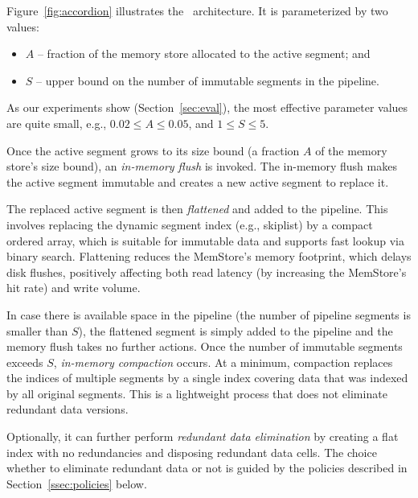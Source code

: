 Figure~\ref{fig:accordion} illustrates the \sys\ architecture. It is parameterized by two values:
\begin{itemize}
\item  $A$ --  fraction of the memory store allocated to the active segment; and 
\item $S$ --  upper bound on the number of immutable segments in the pipeline. 
\end{itemize}

\noindent
As our experiments show (Section~\ref{sec:eval}), the most effective parameter values are quite small, 
e.g., $0.02 \leq A \leq 0.05$, and $1 \leq S \leq 5$.

Once the active segment grows to its size bound (a fraction $A$ of the memory store's size bound), an \emph{in-memory flush} is invoked.
The in-memory flush makes the active segment immutable and creates a new active segment to replace it. 

The replaced active segment is then \emph{flattened} and added to the pipeline.
This involves replacing the dynamic segment index (e.g., skiplist) by a compact ordered array, 
which is suitable for immutable data and supports fast lookup via binary search. 
Flattening reduces the MemStore's memory footprint, which delays  disk flushes, positively affecting both read latency  (by increasing the MemStore's hit rate) and write volume.


In case there is available space in the pipeline (the number of pipeline segments is smaller than $S$), 
the flattened segment is simply added to the pipeline and the memory flush takes no further actions.  
Once the number of immutable segments exceeds $S$, \emph{in-memory compaction} occurs. 
At a minimum, compaction replaces the indices of multiple segments by a single index covering data that was 
indexed by all original segments. This is a lightweight process that does not eliminate redundant data versions.

Optionally, it can further perform \emph{redundant data elimination} by
creating a flat index with no redundancies and disposing redundant data cells. 
%
The choice whether to eliminate redundant data or not is guided by the policies described in Section~\ref{ssec:policies} below.

